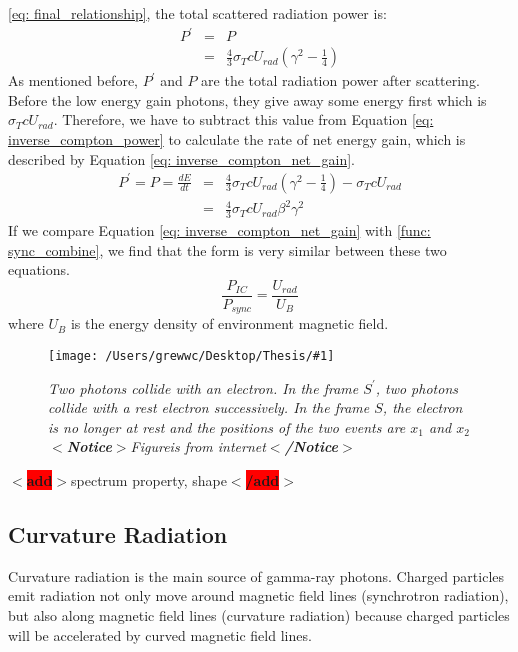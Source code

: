 \documentclass[12pt]{report}
\newcommand{\mycaption}[1]{\caption{\textit{\footnotesize #1}}}
\newcommand{\singleFig}[3]{
 \begin{figure}[!ht]
  \centering
  \texttt{[image: /Users/grewwc/Desktop/Thesis/\#1]}
  \mycaption{#3}
 \label{fig: #1}
 \end{figure}
}
\newcommand{\add}[1]{
  $<$\colorbox{red}{\textbf{add}}$>$#1$<$\colorbox{red}{\textbf{/add}}$>$
}
\newcommand{\Notice}[1]{
  $<$\textbf{Notice}$>$#1$<$\textbf{/Notice}$>$
}
\begin{document}
            \ref{eq: final_relationship}, the total scattered radiation power is:
            \begin{eqnarray}
              \label{eq: inverse_compton_power}
              P^{\prime} &=& P  \nonumber \\
                        &=& \frac{4}{3} \sigma_{T} c U_{rad} \left(\gamma^2 - \frac{1}{4}\right)
            \end{eqnarray}
            As mentioned before, $P^{\prime}$ and $P$ are the total radiation power after scattering. Before the 
            low energy gain photons, they give away some energy first which is $\sigma_{T} c U_{rad}$. 
            Therefore, we have to subtract this value from Equation \ref{eq: inverse_compton_power} to 
            calculate the rate of net energy gain, which is described by Equation 
            \ref{eq: inverse_compton_net_gain}.
            \begin{eqnarray}
              \label{eq: inverse_compton_net_gain}
              P^{\prime} = P = \frac{dE}{dt} &=& \frac{4}{3} \sigma_{T} c U_{rad} \left(\gamma^2 - \frac{1}{4}\right) - \sigma_{T} c U_{rad} \nonumber \\
                                            &=& \frac{4}{3} \sigma_{T} c U_{rad} \beta^{2} \gamma^{2}
            \end{eqnarray}
            If we compare Equation \ref{eq: inverse_compton_net_gain} with \ref{func: sync_combine}, we 
            find that the form is very similar between these two equations. 
            \begin{equation}
              \label{eq: comparision_inverse_compton_and_sync}
              \frac{P_{IC}}{P_{sync}} = \frac{U_{rad}}{U_{B}}
            \end{equation}
            where $U_{B}$ is the energy density of environment magnetic field. 

            \vspace{1cm}
            \singleFig{inverse_compton_time_interval}{0.45}{Two photons collide with an electron. 
              In the frame $S^{\prime}$, two photons collide with a rest electron successively.
              In the frame $S$, the electron is no longer at rest and the positions of the two events 
              are $x_1$ and $x_2$ \Notice{Figureis from internet}}

          \add{spectrum property, shape}
        
        \subsection{Curvature Radiation}
          Curvature radiation is the main source of gamma-ray photons. Charged particles emit 
          radiation not only move around magnetic field lines (synchrotron radiation), 
          but also along magnetic field lines (curvature radiation) because charged particles will be 
          accelerated by curved magnetic field lines. 
\end{document}
